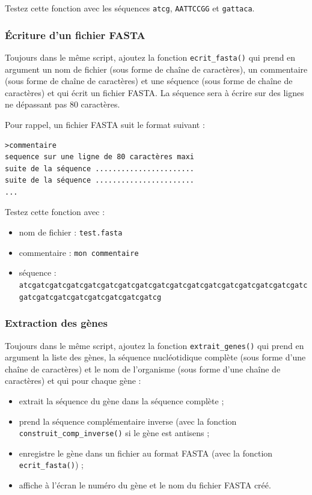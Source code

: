 \documentclass[a4paper,11pt,twoside]{book}
\providecommand{\tightlist}{%
  \setlength{\itemsep}{0pt}\setlength{\parskip}{0pt}}
\begin{document}
Testez cette fonction avec les séquences \texttt{atcg},
\texttt{AATTCCGG} et \texttt{gattaca}.

\subsubsection{Écriture d'un fichier
FASTA}\label{uxe9criture-dun-fichier-fasta}

Toujours dans le même script, ajoutez la fonction
\texttt{ecrit\_fasta()} qui prend en argument un nom de fichier (sous
forme de chaîne de caractères), un commentaire (sous forme de chaîne de
caractères) et une séquence (sous forme de chaîne de caractères) et qui
écrit un fichier FASTA. La séquence sera à écrire sur des lignes ne
dépassant pas 80 caractères.

Pour rappel, un fichier FASTA suit le format suivant :

\begin{verbatim}
>commentaire
sequence sur une ligne de 80 caractères maxi
suite de la séquence .......................
suite de la séquence .......................
...
\end{verbatim}

Testez cette fonction avec :

\begin{itemize}
\tightlist
\item
  nom de fichier : \texttt{test.fasta}
\item
  commentaire : \texttt{mon\ commentaire}
\item
  séquence :
  \texttt{atcgatcgatcgatcgatcgatcgatcgatcgatcgatcgatcgatcgatcgatcgatcgatcgatcgatcgatcgatcgatcgatcgatcgatcgatcg}
\end{itemize}

\subsubsection{Extraction des gènes}\label{extraction-des-guxe8nes}

Toujours dans le même script, ajoutez la fonction
\texttt{extrait\_genes()} qui prend en argument la liste des gènes, la
séquence nucléotidique complète (sous forme d'une chaîne de caractères)
et le nom de l'organisme (sous forme d'une chaîne de caractères) et qui
pour chaque gène :

\begin{itemize}
\tightlist
\item
  extrait la séquence du gène dans la séquence complète ;
\item
  prend la séquence complémentaire inverse (avec la fonction
  \texttt{construit\_comp\_inverse()} si le gène est antisens ;
\item
  enregistre le gène dans un fichier au format FASTA (avec la fonction
  \texttt{ecrit\_fasta()}) ;
\item
  affiche à l'écran le numéro du gène et le nom du fichier FASTA créé.
\end{itemize}
\end{document}
